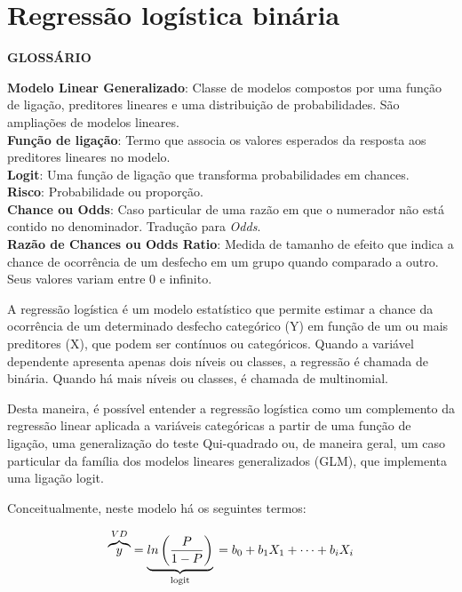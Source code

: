 \documentclass[
]{book}
\newenvironment{writing}{
  \definecolor{shadecolor}{rgb}{0, 0, 0}  %
  \color{white}
  \begin{shaded}}
 {\end{shaded}}
\begin{document}
\hypertarget{regressuxe3o-loguxedstica-binuxe1ria}{%
\chapter{Regressão logística binária}\label{regressuxe3o-loguxedstica-binuxe1ria}}

\begin{writing}

\textbf{GLOSSÁRIO}

\textbf{Modelo Linear Generalizado}: Classe de modelos compostos por uma função de ligação, preditores lineares e uma distribuição de probabilidades. São ampliações de modelos lineares.\\
\textbf{Função de ligação}: Termo que associa os valores esperados da resposta aos preditores lineares no modelo.\\
\textbf{Logit}: Uma função de ligação que transforma probabilidades em chances.\\
\textbf{Risco}: Probabilidade ou proporção.\\
\textbf{Chance ou Odds}: Caso particular de uma razão em que o numerador não está contido no denominador. Tradução para \emph{Odds}.\\
\textbf{Razão de Chances ou Odds Ratio}: Medida de tamanho de efeito que indica a chance de ocorrência de um desfecho em um grupo quando comparado a outro. Seus valores variam entre 0 e infinito.

\end{writing}

A regressão logística é um modelo estatístico que permite estimar a chance da ocorrência de um determinado desfecho categórico (Y) em função de um ou mais preditores (X), que podem ser contínuos ou categóricos. Quando a variável dependente apresenta apenas dois níveis ou classes, a regressão é chamada de binária. Quando há mais níveis ou classes, é chamada de multinomial.

Desta maneira, é possível entender a regressão logística como um complemento da regressão linear aplicada a variáveis categóricas a partir de uma função de ligação, uma generalização do teste Qui-quadrado ou, de maneira geral, um caso particular da família dos modelos lineares generalizados (GLM), que implementa uma ligação logit.

Conceitualmente, neste modelo há os seguintes termos:

\[\overbrace{y}^{VD} = \underbrace{ln\left ( \frac{P}{1-P} \right)}_\text{logit} \\= b_0+b_1X_1+ \dots + b_iX_i\]
\end{document}
